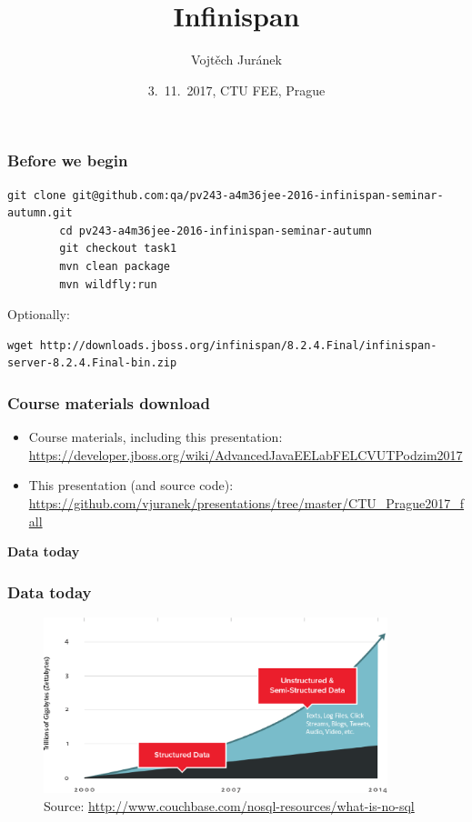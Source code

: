 \documentclass[10pt,utf8]{beamer}
\title{Infinispan}
\author{Vojtěch Juránek}
\institute[Red Hat]{JBoss - a division by Red Hat}
\date{3.~11.~2017, CTU FEE, Prague}
\begin{document}


\begin{frame}[fragile]
	\frametitle{Before we begin}
	\begin{lstlisting}[style=Bash]
		git clone git@github.com:qa/pv243-a4m36jee-2016-infinispan-seminar-autumn.git
		cd pv243-a4m36jee-2016-infinispan-seminar-autumn
		git checkout task1
		mvn clean package
		mvn wildfly:run
	\end{lstlisting}
	\vspace{0.5cm}
	Optionally:
	\begin{lstlisting}[style=Bash]
		wget http://downloads.jboss.org/infinispan/8.2.4.Final/infinispan-server-8.2.4.Final-bin.zip
	\end{lstlisting}
\end{frame}

\begin{frame}
 \titlepage
\end{frame}

\begin{frame}
	\frametitle{Course materials download}
	\scriptsize{
	\begin{itemize}
		\item Course materials, including this presentation:\\
		\color{blue}\url{https://developer.jboss.org/wiki/AdvancedJavaEELabFELCVUTPodzim2017}\color{black}
		\item This presentation (and source code):\\ 
		\color{blue}\url{https://github.com/vjuranek/presentations/tree/master/CTU_Prague2017_fall}\color{black}
	\end{itemize}
	}
\end{frame}

\begin{frame}
	\centering
	\huge{\textbf{Data today}}
\end{frame}


\begin{frame}
	\frametitle{Data today}
	\begin{figure}
		\centering
		\includegraphics[width=10cm]{./img/why-nosql-2.eps}
		\caption{\tiny{Source: \url{http://www.couchbase.com/nosql-resources/what-is-no-sql}}}
	\end{figure}
\end{frame}
\end{document}
